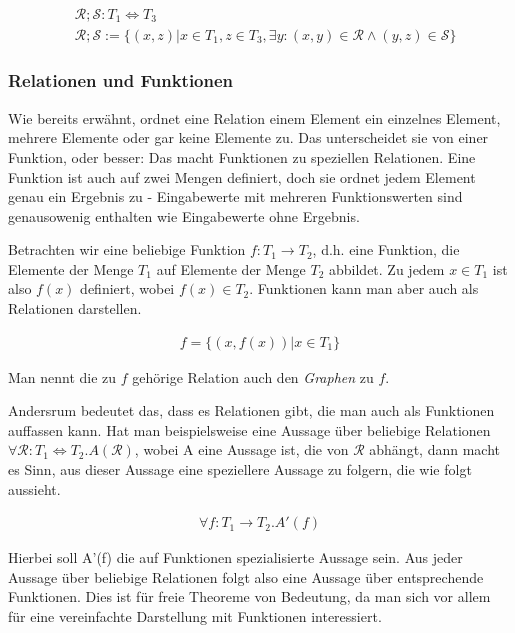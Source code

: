 \begin{align*}
&\mathcal{R} ; \mathcal{S} : T_1 \Leftrightarrow T_3\\
&\mathcal{R} ; \mathcal{S} := \{ (x, z) | x \in T_1, z \in T_3, \exists y : (x, y) \in \mathcal{R} \wedge (y, z) \in \mathcal{S} \}
\end{align*}


\subsubsection{Relationen und Funktionen}

Wie bereits erwähnt, ordnet eine Relation einem Element ein einzelnes Element, mehrere Elemente oder gar keine Elemente zu.
Das unterscheidet sie von einer Funktion, oder besser: Das macht Funktionen zu speziellen Relationen. Eine
Funktion ist auch auf zwei Mengen definiert, doch sie ordnet jedem Element genau ein Ergebnis zu - Eingabewerte mit
mehreren Funktionswerten sind genausowenig enthalten wie Eingabewerte ohne Ergebnis.

Betrachten wir eine beliebige Funktion $f : T_1 \rightarrow T_2$, d.h. eine Funktion, die Elemente der Menge $T_1$ auf
Elemente der Menge $T_2$ abbildet. Zu jedem $x \in T_1$ ist also $f(x)$ definiert, wobei $f(x) \in T_2$. Funktionen kann
man aber auch als Relationen darstellen.

\begin{align*}
f = \{ (x, f(x)) | x \in T_1 \}
\end{align*}

Man nennt die zu $f$ gehörige Relation auch den \textit{Graphen} zu $f$.

Andersrum bedeutet das, dass es Relationen gibt, die man auch als Funktionen auffassen kann. Hat man beispielsweise
eine Aussage über beliebige Relationen $\forall \mathcal{R} : T_1 \Leftrightarrow T_2 . A(\mathcal{R})$, wobei A eine
Aussage ist, die von $\mathcal{R}$ abhängt, dann macht es Sinn, aus dieser Aussage eine speziellere Aussage zu folgern,
die wie folgt aussieht.

\begin{align*}
\forall f : T_1 \rightarrow T_2 . A'(f)
\end{align*}

Hierbei soll A'(f) die auf Funktionen spezialisierte Aussage sein. Aus jeder Aussage über beliebige Relationen folgt also eine
Aussage über entsprechende Funktionen. Dies ist für freie Theoreme von Bedeutung, da man sich vor allem für eine vereinfachte
Darstellung mit Funktionen interessiert.


